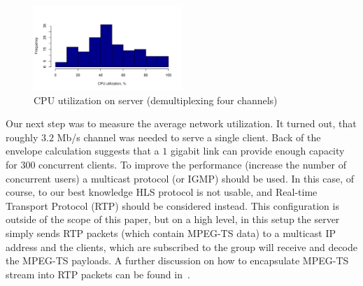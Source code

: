 \begin{figure}[ht]
\includegraphics[width=0.5\textwidth]{graphics/microbanchmarking/cpu_usage_rpi_4_channels.pdf}
\caption{CPU utilization on server (demultiplexing four channels)}
\label{fig:cpu_server_four_channles}
\end{figure}

Our next step was to measure the average network utilization. It turned out,
that roughly $3.2$ Mb/s channel was needed to serve a single client. Back of 
the envelope calculation suggests that a $1$ gigabit link can provide enough 
capacity for $300$ concurrent clients. To improve the performance (increase the number 
of concurrent users) a multicast protocol (or IGMP) should be used. In this case, 
of course, to our best knowledge HLS protocol is not usable, and Real-time 
Transport Protocol (RTP) should be considered instead. This configuration is outside 
of the scope of this paper, but on a high level, in this setup the server simply sends 
RTP packets (which contain MPEG-TS data) to a multicast IP address and the clients, 
which are subscribed to the group will receive and decode the MPEG-TS payloads. 
A further discussion on how to encapsulate MPEG-TS stream into RTP packets can 
be found in~\cite{rfc2250}.


